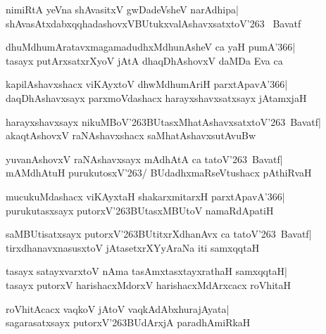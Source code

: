 \documentclass[twoside,12pt,openright]{book}
\newcounter{shloka}[chapter]
\begin{document}
\begin{shloka}%
nimiRtA yeVna shAvasitxV gwDadeVsheV narAdhipa|\\
shAvasAtxdabxqqhadashovxVBUtukxvalAshavxsatxtoV\char'263 ~Bavatf
\end{shloka}

\begin{shloka}%
dhuMdhumAratavxmagamadudhxMdhunAsheV ca yaH pumA\char'366|\\
tasayx putArxsatxrXyoV jAtA dhaqDhAshovxV daMDa Eva ca
\end{shloka}

\begin{shloka}%
kapilAshavxshacx viKAyxtoV dhwMdhumAriH parxtApavA\char'366|\\
daqDhAshavxsayx parxmoVdashacx harayxshavxsatxsayx jAtamxjaH
\end{shloka}

\begin{shloka}%
harayxshavxsayx
nikuMBoV\char'263BUtasxMhatAshavxsatxtoV\char'263\ Bavatf|\\
akaqtAshovxV raNAshavxshacx saMhatAshavxsutAvuBw
\end{shloka}

\begin{shloka}%
yuvanAshovxV raNAshavxsayx mAdhAtA ca tatoV\char'263\ Bavatf|\\
mAMdhAtuH purukutosxV\char'263/ BUdadhxmaRseVtushacx pAthiRvaH
\end{shloka}

\begin{shloka}%
mucukuMdashacx viKAyxtaH shakarxmitarxH parxtApavA\char'366|\\
purukutasxsayx putorxV\char'263BUtasxMBUtoV namaRdApatiH 
\end{shloka}

\begin{shloka}%
saMBUtisatxsayx putorxV\char'263BUtitxrXdhanAvx ca
tatoV\char'263\ Bavatf|\\
tirxdhanavxnasusxtoV jAtasetxrXYyAraNa iti samxqqtaH
\end{shloka}

\begin{shloka}%
tasayx satayxvarxtoV nAma tasAmxtasxtayxrathaH samxqqtaH|\\
tasayx putorxV harishacxMdorxV harishacxMdArxcacx roVhitaH
\end{shloka}

\begin{shloka}%
roVhitAcacx vaqkoV jAtoV vaqkAdAbxhurajAyata|\\
sagarasatxsayx putorxV\char'263BUdArxjA paradhAmiRkaH
\end{shloka}
\end{document}
